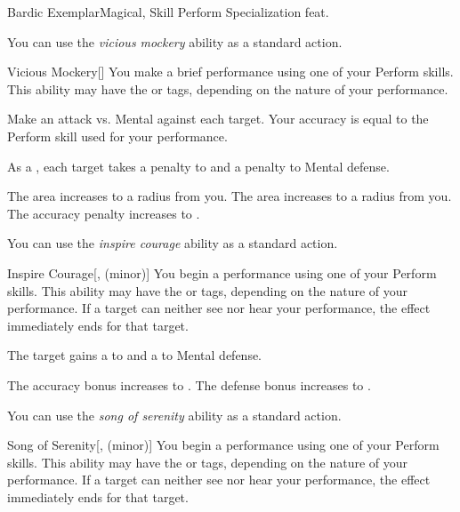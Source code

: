     \begin{feat}{Bardic Exemplar}{Magical, Skill}
        \featpre Perform Specialization feat.

         You can use the \textit{vicious mockery} ability as a standard action.
        \begin{freeability}{Vicious Mockery}[]
            You make a brief performance using one of your Perform skills.
            This ability may have the  or  tags, depending on the nature of your performance.

            Make an attack vs. Mental against each target.
            Your accuracy is equal to the Perform skill used for your performance.

            \hit As a , each target takes a  penalty to  and a  penalty to Mental defense.

            \rankline
             The area increases to a \arealarge radius from you.
             The area increases to a \areahuge radius from you.
             The accuracy penalty increases to .
        \end{freeability}

         You can use the \textit{inspire courage} ability as a standard action.
        \begin{freeability}{Inspire Courage}[,  (minor)]
            You begin a performance using one of your Perform skills.
            This ability may have the  or  tags, depending on the nature of your performance.
            If a target can neither see nor hear your performance, the effect immediately ends for that target.

            The target gains a   to  and a   to Mental defense.

            \rankline
             The accuracy bonus increases to .
             The defense bonus increases to .
        \end{freeability}

         You can use the \textit{song of serenity} ability as a standard action.
        \begin{freeability}{Song of Serenity}[,  (minor)]
            You begin a performance using one of your Perform skills.
            This ability may have the  or  tags, depending on the nature of your performance.
            If a target can neither see nor hear your performance, the effect immediately ends for that target.


\end{freeability}
\end{feat}
